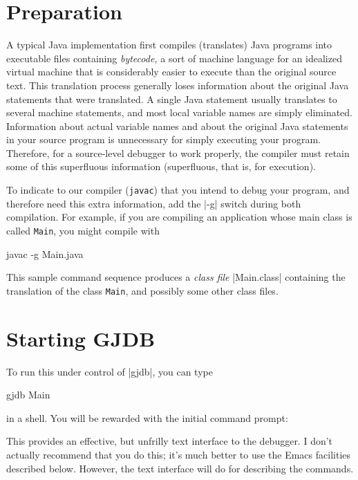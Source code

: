 \documentclass[11pt,twoside]{handout}
\begin{document}
\section{Preparation}
A typical Java implementation first compiles (translates) Java
programs into executable files containing {\it bytecode,\/} a sort of
machine language for an idealized virtual machine that is 
considerably easier to execute than the original source text.
This translation process
generally loses 
information about the original Java statements that were translated.  A
single Java statement usually translates to several machine statements,
and most local variable names are simply eliminated. Information about
actual variable
names and about the original Java statements in your source program is
unnecessary for simply executing your program.
Therefore, for a source-level debugger to work properly, the compiler
must retain some of this superfluous information
(superfluous, that is, for execution).  

To indicate to our compiler ({\tt javac}) that you intend to debug your
program, and therefore need this extra information, add the \prog|-g|
switch during both compilation.  For example, if you are compiling an 
application whose main class is called {\tt Main}, you
might compile with 
\begin{program}
javac -g Main.java
\end{program}

This  sample command sequence  produces a {\it class file\/}
\prog|Main.class| containing the translation of the class {\tt Main},
and possibly some other class files.  

\section{Starting GJDB}
To run this under control of \prog|gjdb|, you
can type
\begin{program}
gjdb Main
\end{program}
in a shell.  You will be rewarded with the initial command prompt:
\begin{program}
[-] 
\end{program}
This provides an effective, but unfrilly text interface to
the debugger.  I don't actually recommend that you do this; it's
much better to use the Emacs facilities described below.  However, the
text interface will do for describing the commands.
\end{document}
